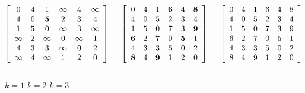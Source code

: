 \begin{Example}
\begin{samepage}
{\footnotesize
%
\[
\left[
\begin{array}{cccccc} %
0        & 4        & 1        &  \infty  & 4        &  \infty  \\
4        & 0        & \textbf{5}    & 2        & 3        & 4 \\
1        & \textbf{5}    & 0        &  \infty  & 3        &  \infty  \\
 \infty  & 2        &  \infty  & 0        &  \infty  & 1 \\
4        & 3        & 3        &  \infty  & 0        & 2 \\
 \infty  & 4        &  \infty  & 1        & 2        & 0 \\
\end{array}
\right]
\hspace{.5cm}
\left[
\begin{array}{cccccc} %
0        & 4        & 1        & \textbf{6}    & 4     & \textbf{8} \\
4        & 0        & 5        & 2        & 3        & 4 \\
1        & 5        & 0        & \textbf{7}    & 3      & \textbf{9} \\
\textbf{6}    & 2        & \textbf{7}    & 0        & \textbf{5}  & 1 \\
4        & 3        & 3        & \textbf{5}    & 0        & 2 \\
\textbf{8}   & 4        & \textbf{9}    & 1        & 2        & 0 \\
\end{array}
\right]
\hspace{.5cm}
\left[
\begin{array}{cccccc} %
0    & 4   & 1   & 6    & 4    & 8 \\
4    & 0   & 5   & 2    & 3    & 4 \\
1    & 5   & 0   & 7    & 3    & 9 \\
6    & 2   & 7   & 0    & 5    & 1 \\
4    & 3   & 3   & 5    & 0    & 2 \\
8    & 4   & 9   & 1    & 2    & 0 \\
\end{array}
\right]
\]\\[-5pt]
\hspace*{1in}$k=1$ \hspace{1.2in} $k=2$ \hspace{1.2in} $k=3$ \\
}
\end{samepage}
\end{Example}
